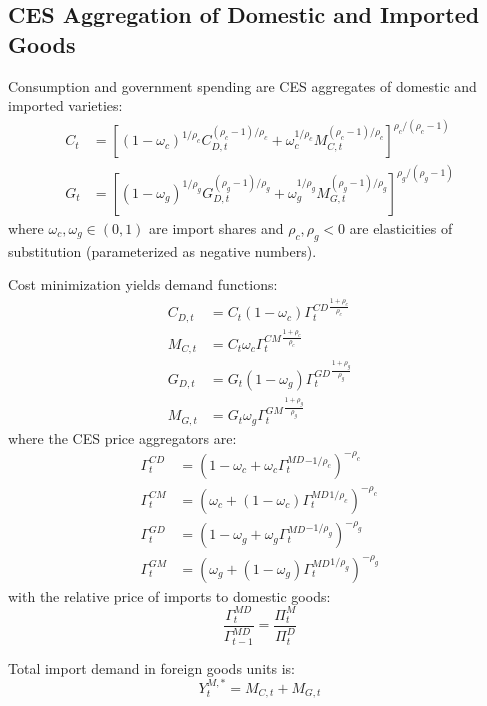 \documentclass[12pt]{article}
\begin{document}
\subsection{CES Aggregation of Domestic and Imported Goods}

Consumption and government spending are CES aggregates of domestic and imported varieties:
\begin{align}
C_t &= \left[ (1-\omega_c)^{1/\rho_c} C_{D,t}^{(\rho_c-1)/\rho_c} + \omega_c^{1/\rho_c} M_{C,t}^{(\rho_c-1)/\rho_c} \right]^{\rho_c/(\rho_c-1)} \\
G_t &= \left[ (1-\omega_g)^{1/\rho_g} G_{D,t}^{(\rho_g-1)/\rho_g} + \omega_g^{1/\rho_g} M_{G,t}^{(\rho_g-1)/\rho_g} \right]^{\rho_g/(\rho_g-1)}
\end{align}
where $\omega_c, \omega_g \in (0,1)$ are import shares and $\rho_c, \rho_g < 0$ are elasticities of substitution (parameterized as negative numbers).

Cost minimization yields demand functions:
\begin{align}
C_{D,t} &= C_t (1-\omega_c) \Gamma_t^{CD} {}^{\frac{1+\rho_c}{\rho_c}} \\
M_{C,t} &= C_t \omega_c \Gamma_t^{CM} {}^{\frac{1+\rho_c}{\rho_c}} \\
G_{D,t} &= G_t (1-\omega_g) \Gamma_t^{GD} {}^{\frac{1+\rho_g}{\rho_g}} \\
M_{G,t} &= G_t \omega_g \Gamma_t^{GM} {}^{\frac{1+\rho_g}{\rho_g}}
\end{align}
where the CES price aggregators are:
\begin{align}
\Gamma_t^{CD} &= (1 - \omega_c + \omega_c \Gamma_t^{MD} {}^{-1/\rho_c})^{-\rho_c} \\
\Gamma_t^{CM} &= (\omega_c + (1-\omega_c) \Gamma_t^{MD} {}^{1/\rho_c})^{-\rho_c} \\
\Gamma_t^{GD} &= (1 - \omega_g + \omega_g \Gamma_t^{MD} {}^{-1/\rho_g})^{-\rho_g} \\
\Gamma_t^{GM} &= (\omega_g + (1-\omega_g) \Gamma_t^{MD} {}^{1/\rho_g})^{-\rho_g}
\end{align}
with the relative price of imports to domestic goods:
\begin{equation}
\frac{\Gamma_t^{MD}}{\Gamma_{t-1}^{MD}} = \frac{\Pi_t^M}{\Pi_t^D}
\end{equation}

Total import demand in foreign goods units is:
\begin{equation}
Y_t^{M,*} = M_{C,t} + M_{G,t}
\end{equation}
\end{document}

